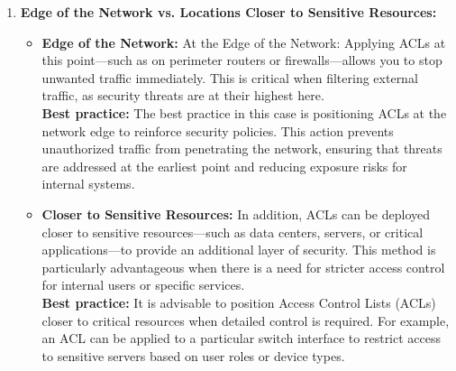 \documentclass[11pt,a4paper]{article}
\begin{document}
\begin{enumerate}
\begin{itemize}
                \end{itemize}
            \item \textbf{Edge of the Network vs. Locations Closer to Sensitive Resources:}
                \begin{itemize}
                    \item \textbf{Edge of the Network:} At the Edge of the Network: Applying ACLs at this point—such as on perimeter routers or firewalls—allows you to stop unwanted traffic immediately. This is critical when filtering external traffic, as security threats are at their highest here.
                    \\[1em]
                    \textbf{Best practice:} The best practice in this case is positioning ACLs at the network edge to reinforce security policies. This action prevents unauthorized traffic from penetrating the network, ensuring that threats are addressed at the earliest point and reducing exposure risks for internal systems.
                    \\[1em]
                    \item \textbf{Closer to Sensitive Resources:} In addition, ACLs can be deployed closer to sensitive resources—such as data centers, servers, or critical applications—to provide an additional layer of security. This method is particularly advantageous when there is a need for stricter access control for internal users or specific services.
                    \\[1em]
                    \textbf{Best practice:} It is advisable to position Access Control Lists (ACLs) closer to critical resources when detailed control is required. For example, an ACL can be applied to a particular switch interface to restrict access to sensitive servers based on user roles or device types.

                \end{itemize}
        \end{enumerate}
\end{document}
